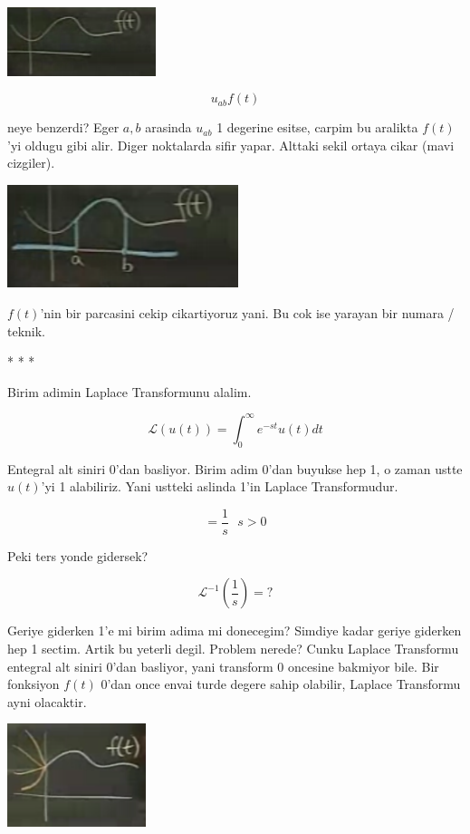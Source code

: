\documentclass[12pt,fleqn]{article}
\begin{document}
\includegraphics[height=2cm]{22_4.png}

\[ u_{ab}f(t) \]

neye benzerdi? Eger $a,b$ arasinda $u_{ab}$ 1 degerine esitse, carpim bu
aralikta $f(t)$'yi oldugu gibi alir. Diger noktalarda sifir yapar. Alttaki
sekil ortaya cikar (mavi cizgiler). 

\includegraphics[height=3cm]{22_5.png}

$f(t)$'nin bir parcasini cekip cikartiyoruz yani. Bu cok ise yarayan bir
numara / teknik. 

* * *

Birim adimin Laplace Transformunu alalim.

\[ \mathcal{L}(u(t)) = \int_{0}^{\infty} e^{-st}u(t) dt  \]

Entegral alt siniri 0'dan basliyor. Birim adim 0'dan buyukse hep 1, o zaman
ustte $u(t)$'yi 1 alabiliriz. Yani ustteki aslinda 1'in Laplace
Transformudur. 

\[ = \frac{1}{s} \ \ \ s>0 \]

Peki ters yonde gidersek? 

\[ \mathcal{L}^{-1}(\frac{1}{s}) = ?  \]

Geriye giderken 1'e mi birim adima mi donecegim? Simdiye kadar geriye
giderken hep 1 sectim. Artik bu yeterli degil. Problem nerede? Cunku
Laplace Transformu entegral alt siniri 0'dan basliyor, yani transform 0
oncesine bakmiyor bile. Bir fonksiyon $f(t)$ 0'dan once envai turde degere
sahip olabilir, Laplace Transformu ayni olacaktir. 

\includegraphics[height=3cm]{22_6.png}
\end{document}
